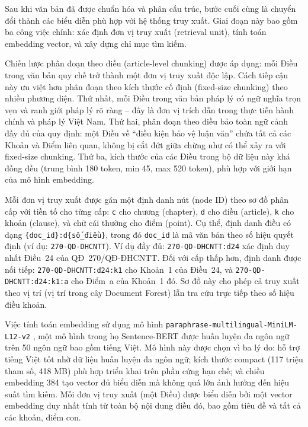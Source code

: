 Sau khi văn bản đã được chuẩn hóa và phân cấu trúc, bước cuối cùng là chuyển
đổi thành các biểu diễn phù hợp với hệ thống truy xuất. Giai đoạn này bao gồm
ba công việc chính: xác định đơn vị truy xuất (retrieval unit), tính toán
embedding vector, và xây dựng chỉ mục tìm kiếm.

Chiến lược phân đoạn theo điều (article-level chunking) được áp dụng: mỗi Điều
trong văn bản quy chế trở thành một đơn vị truy xuất độc lập. Cách tiếp cận này
ưu việt hơn phân đoạn theo kích thước cố định (fixed-size chunking) \cite{manning2008ir}
theo nhiều phương diện. Thứ nhất, mỗi Điều trong văn bản pháp lý có ngữ nghĩa
trọn vẹn và ranh giới pháp lý rõ ràng -- đây là đơn vị trích dẫn trong thực
tiễn hành chính và pháp lý Việt Nam. Thứ hai, phân đoạn theo điều bảo toàn ngữ
cảnh đầy đủ của quy định: một Điều về ``điều kiện bảo vệ luận văn'' chứa tất
cả các Khoản và Điểm liên quan, không bị cắt đứt giữa chừng như có thể xảy ra
với fixed-size chunking. Thứ ba, kích thước của các Điều trong bộ dữ liệu này
khá đồng đều (trung bình 180 token, min 45, max 520 token), phù hợp với giới
hạn của mô hình embedding.

Mỗi đơn vị truy xuất được gán một định danh nút (node ID) theo sơ đồ phân cấp
với tiền tố cho từng cấp: \texttt{c} cho chương (chapter), \texttt{d} cho điều
(article), \texttt{k} cho khoản (clause), và chữ cái thường cho điểm (point).
Cụ thể, định danh điều có dạng \texttt{\{doc\_id\}:d\{số\_điều\}}, trong đó
\texttt{doc\_id} là mã văn bản theo số hiệu quyết định (ví dụ:
\texttt{270-QD-DHCNTT}). Ví dụ đầy đủ: \texttt{270-QD-DHCNTT:d24} xác định
duy nhất Điều~24 của QĐ~270/QĐ-ĐHCNTT. Đối với cấp thấp hơn, định danh được
nối tiếp: \texttt{270-QD-DHCNTT:d24:k1} cho Khoản~1 của Điều~24, và
\texttt{270-QD-DHCNTT:d24:k1:a} cho Điểm~a của Khoản~1 đó.
Sơ đồ này cho phép cả truy xuất theo vị trí (vị trí trong cây Document
Forest) lẫn tra cứu trực tiếp theo số hiệu điều khoản.

Việc tính toán embedding sử dụng mô hình \texttt{paraphrase-multilingual-MiniLM-L12-v2}
\cite{reimers2019sbert}, một mô hình trong họ Sentence-BERT được huấn luyện đa
ngôn ngữ trên 50 ngôn ngữ bao gồm tiếng Việt. Mô hình này được chọn vì ba lý
do: hỗ trợ tiếng Việt tốt nhờ dữ liệu huấn luyện đa ngôn ngữ; kích thước
compact (117 triệu tham số, 418 MB) phù hợp triển khai trên phần cứng hạn chế;
và chiều embedding 384 tạo vector đủ biểu diễn mà không quá lớn ảnh hưởng
đến hiệu suất tìm kiếm. Mỗi đơn vị truy xuất (một Điều) được biểu diễn bởi một
vector embedding duy nhất tính từ toàn bộ nội dung điều đó, bao gồm tiêu đề và
tất cả các khoản, điểm con.

